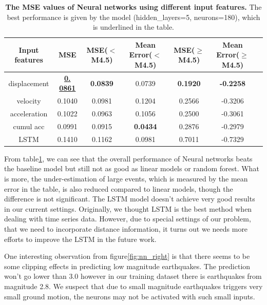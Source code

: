 \documentclass{article} %
\begin{document}
\begin{table}[htbp]
	\small
	\centering
	\begin{tabular}{@{}|c|c|c|c|c|c|c|@{}} %
		\hline
		\cline{2-6}
		Input features & MSE & MSE($<$M4.5) & Mean Error($<$M4.5)& MSE($\geq$M4.5) & Mean Error($\geq$M4.5)\\ 
		\cline{2-6} \hline \hline
		displacement & \textbf{\underline{0. 0861}} & \textbf{0.0839} & 0.0739 & \textbf{0.1920}  & \textbf{-0.2258} \\
		 velocity & 0.1040  &  0.0981 & 0.1204 & 0.2566 & -0.3206\\ 
		acceleration &  0.1022 & 0.0963 & 0.1056 & 0.2500 & -0.3061 \\ 
		 cumul acc & 0.0991 & 0.0915 & \textbf{0.0434} & 0.2876  & -0.2979 \\ 
		 LSTM & 0.1410 & 0.1162 & 0.0981 & 0.7011 & -0.7329 \\
		 \hline
	\end{tabular}
	\caption{{\bf The MSE values of Neural networks using different input features.} The best performance is given by the model (hidden\_layers=5, neurons=180), which is underlined in the table.}
	\label{tab:nn_perf}
\end{table}

From table\ref{tab:nn_perf}, we can see that the overall performance of Neural networks beats the baseline model but still not as good as linear models or random forest. What is more, the under-estimation of large events, which is measured by the mean error in the table, is also reduced compared to linear models, though the difference is not significant. The LSTM model doesn't achieve very good results in our current settings. Originally, we thought LSTM is the best method when dealing with time series data. However, due to special settings of our problem, that we need to incorporate distance information, it turns out we needs more efforts to improve the LSTM in the future work.

One interesting observation from figure\ref{fig:nn_right} is that there seems to be some clipping effects in predicting low magnitude earthquakes. The prediction won't go lower than 3.0 however in our training dataset there is earthquakes from magnitude 2.8. We suspect that due to small magnitude earthquakes triggers very small ground motion, the neurons may not be activated with such small inputs.
\end{document}
